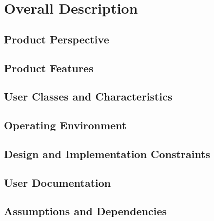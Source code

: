 \section{Overall Description}

\subsection{Product Perspective}


\subsection{Product Features}


\subsection{User Classes and Characteristics}


\subsection{Operating Environment}


\subsection{Design and Implementation Constraints}


\subsection{User Documentation}


\subsection{Assumptions and Dependencies}
